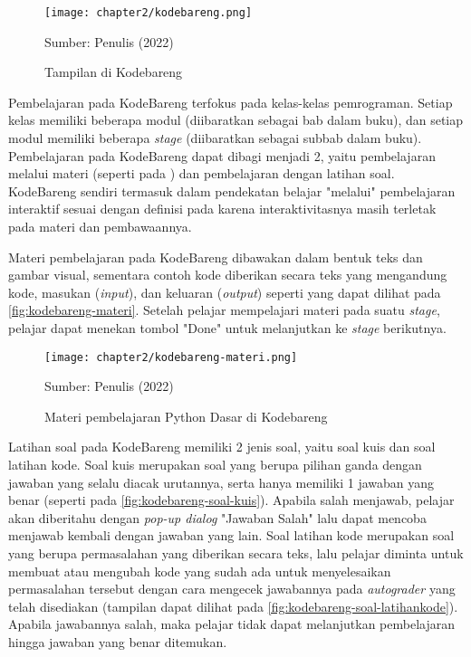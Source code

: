 \begin{figure}[!h]
  \centering
  \texttt{[image: chapter2/kodebareng.png]}
  \caption{Tampilan di Kodebareng}\label{fig:kodebareng-tampilan}
  Sumber: Penulis (2022)
\end{figure}

Pembelajaran pada KodeBareng terfokus pada kelas-kelas pemrograman. Setiap kelas memiliki beberapa modul (diibaratkan sebagai bab dalam buku), dan setiap modul memiliki beberapa \textit{stage} (diibaratkan sebagai subbab dalam buku). Pembelajaran pada KodeBareng dapat dibagi menjadi 2, yaitu pembelajaran melalui materi (seperti pada ) dan pembelajaran dengan latihan soal. KodeBareng sendiri termasuk dalam pendekatan belajar "melalui" pembelajaran interaktif sesuai dengan definisi pada \textcite{reeves2012interactive} karena interaktivitasnya masih terletak pada materi dan pembawaannya.

Materi pembelajaran pada KodeBareng dibawakan dalam bentuk teks dan gambar visual, sementara contoh kode diberikan secara teks yang mengandung kode, masukan (\textit{input}), dan keluaran (\textit{output}) seperti yang dapat dilihat pada \autoref{fig:kodebareng-materi}. Setelah pelajar mempelajari materi pada suatu \textit{stage}, pelajar dapat menekan tombol "Done" untuk melanjutkan ke \textit{stage} berikutnya.

\begin{figure}[!h]
  \centering
  \texttt{[image: chapter2/kodebareng-materi.png]}
  \caption{Materi pembelajaran Python Dasar di Kodebareng}\label{fig:kodebareng-materi}
  Sumber: Penulis (2022)
\end{figure}

Latihan soal pada KodeBareng memiliki 2 jenis soal, yaitu soal kuis dan soal latihan kode. Soal kuis merupakan soal yang berupa pilihan ganda dengan jawaban yang selalu diacak urutannya, serta hanya memiliki 1 jawaban yang benar (seperti pada \autoref{fig:kodebareng-soal-kuis}). Apabila salah menjawab, pelajar akan diberitahu dengan \textit{pop-up dialog} "Jawaban Salah" lalu dapat mencoba menjawab kembali dengan jawaban yang lain. Soal latihan kode merupakan soal yang berupa permasalahan yang diberikan secara teks, lalu pelajar diminta untuk membuat atau mengubah kode yang sudah ada untuk menyelesaikan permasalahan tersebut dengan cara mengecek jawabannya pada \textit{autograder} yang telah disediakan (tampilan dapat dilihat pada \autoref{fig:kodebareng-soal-latihankode}). Apabila jawabannya salah, maka pelajar tidak dapat melanjutkan pembelajaran hingga jawaban yang benar ditemukan.

